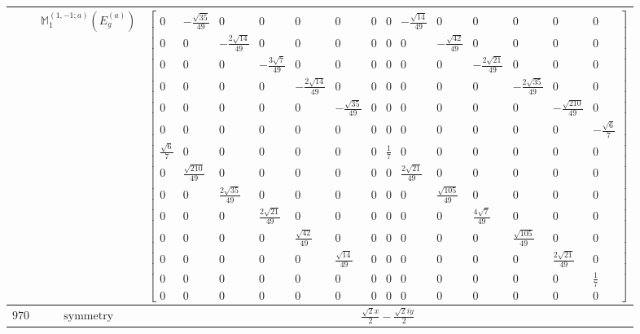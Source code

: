 \documentclass[fleqn,8pt,landscape]{jsarticle}
\begin{document}
\begin{longtable}{ccc}
$  $ & $ \mathbb{M}_{1}^{(1,-1;a)}(E_{g}^{(a)}) $ & $ \begin{bmatrix} 0 & - \frac{\sqrt{35}}{49} & 0 & 0 & 0 & 0 & 0 & 0 & - \frac{\sqrt{14}}{49} & 0 & 0 & 0 & 0 & 0 \\ 0 & 0 & - \frac{2 \sqrt{14}}{49} & 0 & 0 & 0 & 0 & 0 & 0 & - \frac{\sqrt{42}}{49} & 0 & 0 & 0 & 0 \\ 0 & 0 & 0 & - \frac{3 \sqrt{7}}{49} & 0 & 0 & 0 & 0 & 0 & 0 & - \frac{2 \sqrt{21}}{49} & 0 & 0 & 0 \\ 0 & 0 & 0 & 0 & - \frac{2 \sqrt{14}}{49} & 0 & 0 & 0 & 0 & 0 & 0 & - \frac{2 \sqrt{35}}{49} & 0 & 0 \\ 0 & 0 & 0 & 0 & 0 & - \frac{\sqrt{35}}{49} & 0 & 0 & 0 & 0 & 0 & 0 & - \frac{\sqrt{210}}{49} & 0 \\ 0 & 0 & 0 & 0 & 0 & 0 & 0 & 0 & 0 & 0 & 0 & 0 & 0 & - \frac{\sqrt{6}}{7} \\ \frac{\sqrt{6}}{7} & 0 & 0 & 0 & 0 & 0 & 0 & \frac{1}{7} & 0 & 0 & 0 & 0 & 0 & 0 \\ 0 & \frac{\sqrt{210}}{49} & 0 & 0 & 0 & 0 & 0 & 0 & \frac{2 \sqrt{21}}{49} & 0 & 0 & 0 & 0 & 0 \\ 0 & 0 & \frac{2 \sqrt{35}}{49} & 0 & 0 & 0 & 0 & 0 & 0 & \frac{\sqrt{105}}{49} & 0 & 0 & 0 & 0 \\ 0 & 0 & 0 & \frac{2 \sqrt{21}}{49} & 0 & 0 & 0 & 0 & 0 & 0 & \frac{4 \sqrt{7}}{49} & 0 & 0 & 0 \\ 0 & 0 & 0 & 0 & \frac{\sqrt{42}}{49} & 0 & 0 & 0 & 0 & 0 & 0 & \frac{\sqrt{105}}{49} & 0 & 0 \\ 0 & 0 & 0 & 0 & 0 & \frac{\sqrt{14}}{49} & 0 & 0 & 0 & 0 & 0 & 0 & \frac{2 \sqrt{21}}{49} & 0 \\ 0 & 0 & 0 & 0 & 0 & 0 & 0 & 0 & 0 & 0 & 0 & 0 & 0 & \frac{1}{7} \\ 0 & 0 & 0 & 0 & 0 & 0 & 0 & 0 & 0 & 0 & 0 & 0 & 0 & 0 \end{bmatrix} $ \\ \hline
$ 970 $ & $ \text{symmetry} $ & $ \frac{\sqrt{2} x}{2} - \frac{\sqrt{2} i y}{2} $ \\

\end{longtable}
\end{document}
